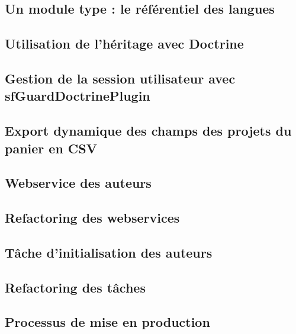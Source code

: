 \subsection{Un module type : le référentiel des langues}

\subsection{Utilisation de l'héritage avec Doctrine}

\subsection{Gestion de la session utilisateur avec sfGuardDoctrinePlugin}

\subsection{Export dynamique des champs des projets du panier en CSV}

\subsection{Webservice des auteurs}

\subsection{Refactoring des webservices}

\subsection{Tâche d'initialisation des auteurs}

\subsection{Refactoring des tâches}

\subsection{Processus de mise en production}
